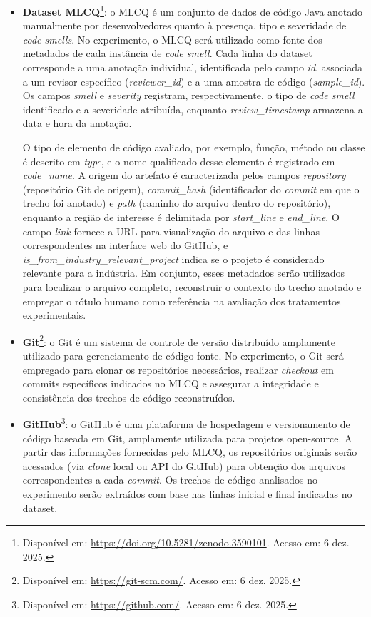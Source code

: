 \begin{itemize}
    \item \textbf{Dataset MLCQ}\footnote{Disponível em: \href{https://doi.org/10.5281/zenodo.3590101}{https://doi.org/10.5281/zenodo.3590101}. Acesso em: 6 dez. 2025.}: o MLCQ é um conjunto 
    de dados de código Java anotado manualmente por desenvolvedores quanto à presença, tipo e severidade de \textit{code smells}. 
    No experimento, o MLCQ será utilizado como fonte dos metadados de cada instância de \textit{code smell}. Cada linha do dataset 
    corresponde a uma anotação individual, identificada pelo campo \textit{id}, associada a um revisor específico (\textit{reviewer\_id}) e 
    a uma amostra de código (\textit{sample\_id}). Os campos \textit{smell} e \textit{severity} registram, respectivamente, o tipo de \textit{code smell} 
    identificado e a severidade atribuída, enquanto \textit{review\_timestamp} armazena a data e hora da anotação. 
    
    O tipo de elemento de código avaliado, por exemplo, função, método ou classe é descrito em \textit{type}, e o nome qualificado desse elemento é registrado em \textit{code\_name}. 
    A origem do artefato é caracterizada pelos campos \textit{repository} (repositório Git de origem), \textit{commit\_hash} (identificador do 
    \textit{commit} em que o trecho foi anotado) e \textit{path} (caminho do arquivo dentro do repositório), enquanto a região de interesse é delimitada 
    por \textit{start\_line} e \textit{end\_line}. O campo \textit{link} fornece a URL para visualização do arquivo e das linhas correspondentes na 
    interface web do GitHub, e \textit{is\_from\_industry\_relevant\_project} indica se o projeto é considerado relevante para a indústria. Em conjunto, 
    esses metadados serão utilizados para localizar o arquivo completo, reconstruir o contexto do trecho anotado e empregar o rótulo humano como 
    referência na avaliação dos tratamentos experimentais.


    \item \textbf{Git}\footnote{Disponível em: \href{https://git-scm.com/}{https://git-scm.com/}. Acesso em: 6 dez. 2025.}: o Git é um sistema de controle de versão distribuído amplamente
    utilizado para gerenciamento de código-fonte. No experimento, o Git será empregado
    para clonar os repositórios necessários, realizar \textit{checkout} em commits
    específicos indicados no MLCQ e assegurar a integridade e consistência dos trechos
    de código reconstruídos.
    
    \item \textbf{GitHub}\footnote{Disponível em: \href{https://github.com/}{https://github.com/}. Acesso em: 6 dez. 2025.}: o GitHub é uma plataforma de hospedagem e versionamento de
    código baseada em Git, amplamente utilizada para projetos open-source. A partir
    das informações fornecidas pelo MLCQ, os repositórios originais serão acessados 
    (via \textit{clone} local ou API do GitHub) para obtenção dos arquivos 
    correspondentes a cada \textit{commit}. Os trechos de código analisados no 
    experimento serão extraídos com base nas linhas inicial e final indicadas no dataset.
    

\end{itemize}
